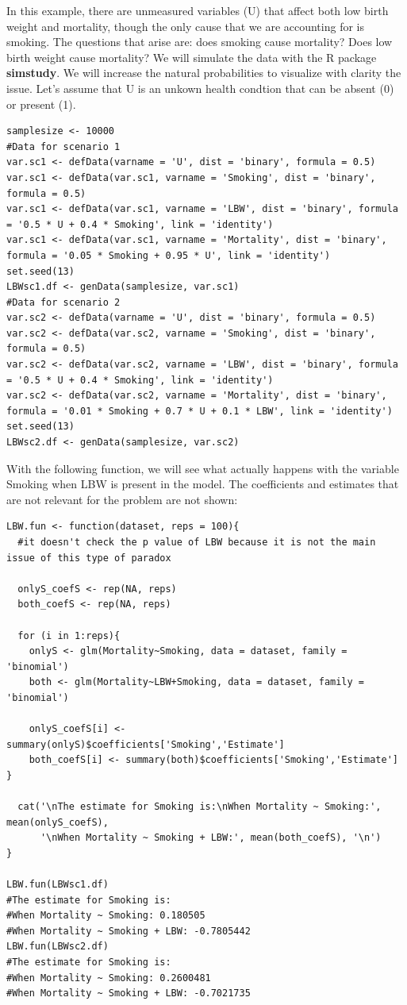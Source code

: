 \documentclass{article}
\begin{document}
In this example, there are unmeasured variables (U) that affect both low birth weight and mortality, though the only cause that we are accounting for is smoking. The questions that arise are: does smoking cause mortality? Does low birth weight cause mortality? We will simulate the data with the R package \textbf{simstudy}. We will increase the natural probabilities to visualize with clarity the issue. Let's assume that U is an unkown health condtion that can be absent (0) or present (1).
\begin{lstlisting}
samplesize <- 10000
#Data for scenario 1
var.sc1 <- defData(varname = 'U', dist = 'binary', formula = 0.5)
var.sc1 <- defData(var.sc1, varname = 'Smoking', dist = 'binary', formula = 0.5)
var.sc1 <- defData(var.sc1, varname = 'LBW', dist = 'binary', formula = '0.5 * U + 0.4 * Smoking', link = 'identity')
var.sc1 <- defData(var.sc1, varname = 'Mortality', dist = 'binary', formula = '0.05 * Smoking + 0.95 * U', link = 'identity')
set.seed(13)
LBWsc1.df <- genData(samplesize, var.sc1)
#Data for scenario 2
var.sc2 <- defData(varname = 'U', dist = 'binary', formula = 0.5)
var.sc2 <- defData(var.sc2, varname = 'Smoking', dist = 'binary', formula = 0.5)
var.sc2 <- defData(var.sc2, varname = 'LBW', dist = 'binary', formula = '0.5 * U + 0.4 * Smoking', link = 'identity')
var.sc2 <- defData(var.sc2, varname = 'Mortality', dist = 'binary', formula = '0.01 * Smoking + 0.7 * U + 0.1 * LBW', link = 'identity')
set.seed(13)
LBWsc2.df <- genData(samplesize, var.sc2)
\end{lstlisting}
With the following function, we will see what actually happens with the variable Smoking when LBW is present in the model. The coefficients and estimates that are not relevant for the problem are not shown:
\begin{lstlisting}
LBW.fun <- function(dataset, reps = 100){
  #it doesn't check the p value of LBW because it is not the main issue of this type of paradox
  
  onlyS_coefS <- rep(NA, reps)
  both_coefS <- rep(NA, reps)
  
  for (i in 1:reps){
    onlyS <- glm(Mortality~Smoking, data = dataset, family = 'binomial')
    both <- glm(Mortality~LBW+Smoking, data = dataset, family = 'binomial')
    
    onlyS_coefS[i] <- summary(onlyS)$coefficients['Smoking','Estimate']
    both_coefS[i] <- summary(both)$coefficients['Smoking','Estimate'] }
  
  cat('\nThe estimate for Smoking is:\nWhen Mortality ~ Smoking:', mean(onlyS_coefS),
      '\nWhen Mortality ~ Smoking + LBW:', mean(both_coefS), '\n')
}

LBW.fun(LBWsc1.df)
#The estimate for Smoking is:
#When Mortality ~ Smoking: 0.180505 
#When Mortality ~ Smoking + LBW: -0.7805442
LBW.fun(LBWsc2.df)
#The estimate for Smoking is:
#When Mortality ~ Smoking: 0.2600481 
#When Mortality ~ Smoking + LBW: -0.7021735 
\end{lstlisting}
\end{document}
